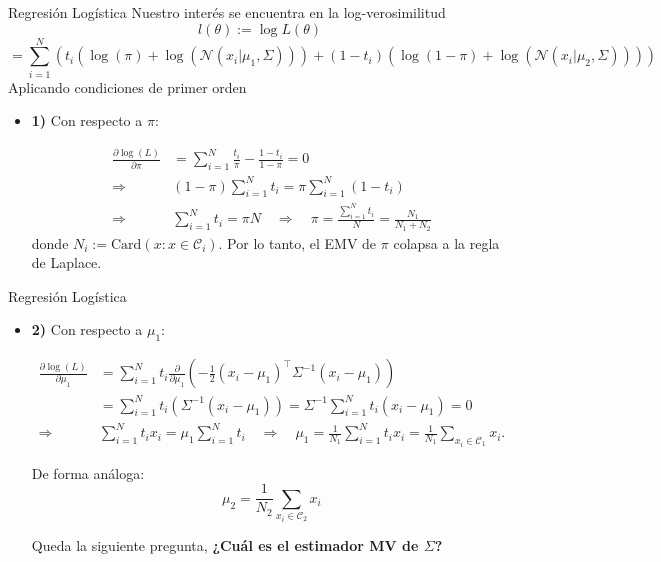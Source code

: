 \documentclass[9pt, handout]{beamer}
\begin{document}
\begin{frame}{Regresión Logística}
Nuestro interés se encuentra en la log-verosimilitud 
\begin{equation*}
  l(\theta) := \log L(\theta) 
\end{equation*} 
\begin{equation*}
= \sum_{i=1}^{N}\left(t_i(\log(\pi)+\log(\mathcal{N}(x_i|\mu_1,\Sigma)))+(1-t_i)(\log(1-\pi)+\log(\mathcal{N}(x_i|\mu_2,\Sigma)))\right)
\end{equation*} \pause
Aplicando condiciones de primer orden

\begin{itemize}
  
\item \textbf{1)} Con respecto a $\pi$:
  
  \begin{align}
  \frac{\partial\log(L)}{\partial\pi} &= \sum_{i=1}^N \frac{t_i}{\pi}-\frac{1-t_i}{1-\pi}=0\nonumber\\
  \Rightarrow \quad & (1-\pi)\sum_{i=1}^Nt_i = \pi\sum_{i=1}^N(1-t_i)\nonumber\\
  \Rightarrow \quad & \sum_{i=1}^Nt_i=\pi N \quad\Rightarrow\quad \pi = \frac{\sum_{i=1}^Nt_i}{N} = \frac{N_1}{N_1+N_2} \label{eq:log_reg_pi}
  \end{align}
donde $N_i:=\text{Card}(x:x\in\mathcal{C}_i)$. Por lo tanto, el EMV de $\pi$ colapsa a la regla de Laplace.

\end{itemize}
\end{frame}

\begin{frame}{Regresión Logística}
\begin{itemize}
\item \textbf{2)} Con respecto a $\mu_1$:
  
  \begin{align*}
  \frac{\partial\log(L)}{\partial\mu_1} &= \sum_{i=1}^N t_i
  \frac{\partial}{\partial \mu_1}(-\frac{1}{2}(x_i-\mu_1)^\top \Sigma^{-1}(x_i-\mu_1))\nonumber\\
  &= \sum_{i=1}^N t_i(\Sigma^{-1}(x_i-\mu_1)) =
  \Sigma^{-1}\sum_{i=1}^N t_i(x_i-\mu_1) = 0\nonumber\\
  \Rightarrow\quad & \sum_{i=1}^Nt_ix_i= \mu_1\sum_{i=1}^N t_i
  \quad\Rightarrow\quad \mu_1  = \frac{1}{N_1}\sum_{i=1}^Nt_ix_i = \frac{1}{N_1}\sum_{x_i\in \mathcal{C}_1}x_i. \label{eq:log_reg_mu1}
  \end{align*}
  
  De forma análoga:
  \begin{equation*}
  \mu_2 = \frac{1}{N_2}\sum_{x_i\in \mathcal{C}_2}x_i \label{eq:log_reg_mu2}
  \end{equation*} \pause

  Queda la siguiente pregunta, \textbf{¿Cuál es el estimador MV de $\Sigma$?}
  
\end{itemize}

\end{frame}
\end{document}
